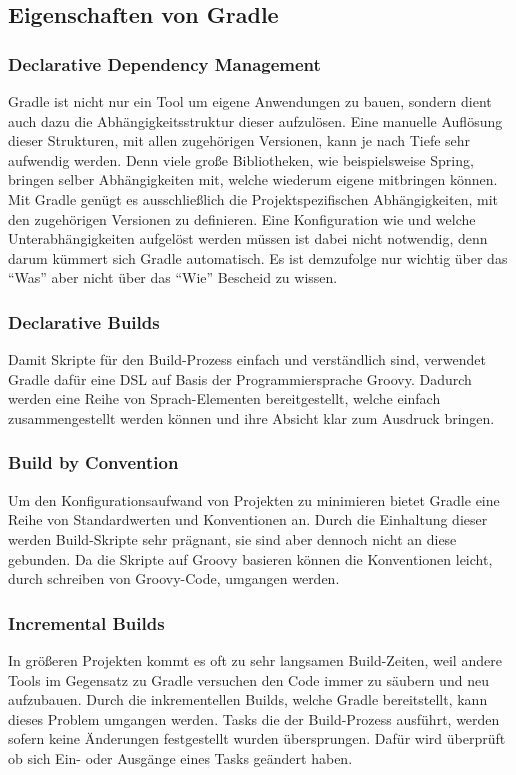 \subsection{Eigenschaften von Gradle}
\subsubsection{Declarative Dependency Management}
Gradle ist nicht nur ein Tool um eigene Anwendungen zu bauen, sondern dient auch dazu die Abhängigkeitsstruktur dieser aufzulösen. Eine manuelle Auflösung dieser Strukturen, mit allen zugehörigen Versionen, kann je nach Tiefe sehr aufwendig werden. Denn viele große Bibliotheken, wie beispielsweise Spring, bringen selber Abhängigkeiten mit, welche wiederum eigene mitbringen können. Mit Gradle genügt es ausschließlich die Projektspezifischen Abhängigkeiten, mit den zugehörigen Versionen zu definieren. Eine Konfiguration wie und welche Unterabhängigkeiten aufgelöst werden müssen ist dabei nicht notwendig, denn darum kümmert sich Gradle automatisch. Es ist demzufolge nur wichtig über das \enquote{Was} aber nicht über das \enquote{Wie} Bescheid zu wissen.

\subsubsection{Declarative Builds}
Damit Skripte für den Build-Prozess einfach und verständlich sind, verwendet Gradle dafür eine \gls{DSL} auf Basis der Programmiersprache Groovy. Dadurch werden eine Reihe von Sprach-Elementen bereitgestellt, welche einfach zusammengestellt werden können und ihre Absicht klar zum Ausdruck bringen.

\subsubsection{Build by Convention}
Um den Konfigurationsaufwand von Projekten zu minimieren bietet Gradle eine Reihe von Standardwerten und Konventionen an. Durch die Einhaltung dieser werden Build-Skripte sehr prägnant, sie sind aber dennoch nicht an diese gebunden. Da die Skripte auf Groovy basieren können die Konventionen leicht, durch schreiben von Groovy-Code, umgangen werden.

\subsubsection{Incremental Builds}
In größeren Projekten kommt es oft zu sehr langsamen Build-Zeiten, weil andere Tools im Gegensatz zu Gradle versuchen den Code immer zu säubern und neu aufzubauen. Durch die inkrementellen Builds, welche Gradle bereitstellt, kann dieses Problem umgangen werden. Tasks die der Build-Prozess ausführt, werden sofern keine Änderungen festgestellt wurden übersprungen. Dafür wird überprüft ob sich Ein- oder Ausgänge eines Tasks geändert haben.

